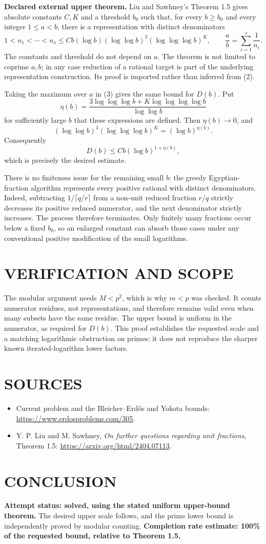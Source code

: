 \textbf{Declared external upper theorem.} Liu and Sawhney's Theorem 1.5 gives absolute constants $C,K$ and a threshold $b_0$ such that, for every $b\geq b_0$ and every integer $1\leq a<b$, there is a representation with distinct denominators
\[
1<n_1<\cdots<n_s
\leq Cb(\log b)(\log\log b)^3(\log\log\log b)^K,
\qquad \frac ab=\sum_{i=1}^s\frac1{n_i}.
\tag{3}
\]
The constants and threshold do not depend on $a$. The theorem is not limited to coprime $a,b$; in any case reduction of a rational target is part of the underlying representation construction. Its proof is imported rather than inferred from (2).

Taking the maximum over $a$ in (3) gives the same bound for $D(b)$. Put
\[
\eta(b)=\frac{3\log\log\log b+K\log\log\log\log b}{\log\log b}
\]
for sufficiently large $b$ that these expressions are defined. Then $\eta(b)\to0$, and
\[
(\log\log b)^3(\log\log\log b)^K=(\log b)^{\eta(b)}.
\]
Consequently
\[
D(b)\leq Cb(\log b)^{1+\eta(b)},
\tag{4}
\]
which is precisely the desired estimate.

There is no finiteness issue for the remaining small $b$: the greedy Egyptian-fraction algorithm represents every positive rational with distinct denominators. Indeed, subtracting $1/\lceil q/r\rceil$ from a non-unit reduced fraction $r/q$ strictly decreases its positive reduced numerator, and the next denominator strictly increases. The process therefore terminates. Only finitely many fractions occur below a fixed $b_0$, so an enlarged constant can absorb those cases under any conventional positive modification of the small logarithms.

\section{VERIFICATION AND SCOPE}
The modular argument needs $M<p^2$, which is why $m<p$ was checked. It counts numerator residues, not representations, and therefore remains valid even when many subsets have the same residue. The upper bound is uniform in the numerator, as required for $D(b)$. This proof establishes the requested scale and a matching logarithmic obstruction on primes; it does not reproduce the sharper known iterated-logarithm lower factors.

\section{SOURCES}
\begin{itemize}
\item Current problem and the Bleicher--Erd\H{o}s and Yokota bounds: \url{https://www.erdosproblems.com/305}.
\item Y. P. Liu and M. Sawhney, \emph{On further questions regarding unit fractions}, Theorem 1.5: \url{https://arxiv.org/html/2404.07113}.
\end{itemize}
\section{CONCLUSION}
\textbf{Attempt status: solved, using the stated uniform upper-bound theorem.}
The desired upper scale follows, and the prime lower bound is independently proved by modular counting.
\textbf{Completion rate estimate: 100\% of the requested bound, relative to Theorem 1.5.}
